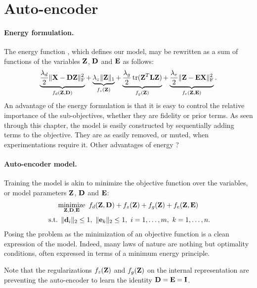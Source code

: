\section{Auto-encoder}

\paragraph{Energy formulation.}
The energy function , which defines our model, may be rewritten as a sum of functions of the variables $\mathbf{Z}$, $\mathbf{D}$ and $\mathbf{E}$ as follows:
\begin{equation} \label{eqn:objective}
	\underbrace{\frac{\lambda_d}{2} \| \mathbf{X} - \mathbf{D} \mathbf{Z} \|_\text{F}^2}_{f_d(\mathbf{Z}, \mathbf{D})} +
	\underbrace{\lambda_z \| \mathbf{Z} \|_1}_{f_z(\mathbf{Z})} +
	\underbrace{\frac{\lambda_g}{2} \operatorname*{tr}(\mathbf{Z}^T \mathbf{L} \mathbf{Z})}_{f_g(\mathbf{Z})} +
	\underbrace{\frac{\lambda_e}{2} \| \mathbf{Z} - \mathbf{E} \mathbf{X} \|_\text{F}^2}_{f_e(\mathbf{Z}, \mathbf{E})}.
\end{equation}
An advantage of the energy formulation is that it is easy to control the relative importance of the sub-objectives, whether they are fidelity or prior terms. As seen through this chapter, the model is easily constructed by sequentially adding terms to the objective. They are as easily removed, or muted, when experimentations require it.
{\color{red} Other advantages of energy ?}

\paragraph{Auto-encoder model.}
Training the model is akin to minimize the objective function  over the variables, or model parameters $\mathbf{Z}$, $\mathbf{D}$ and $\mathbf{E}$:
\begin{multline} \label{eqn:model}
	\operatorname*{minimize}\limits_{\mathbf{Z},\mathbf{D},\mathbf{E}} \  f_d(\mathbf{Z}, \mathbf{D}) + f_z(\mathbf{Z}) + f_g(\mathbf{Z}) + f_e(\mathbf{Z}, \mathbf{E}) \\
	\text{ s.t. } \|\mathbf{d}_i\|_2 \leq 1 ,\ \|\mathbf{e}_k\|_2 \leq 1 ,\ i = 1, \ldots, m ,\ k = 1, \ldots, n.
\end{multline}
Posing the problem as the minimization of an objective function is a clean expression of the model. Indeed, many laws of nature are nothing but optimality conditions, often expressed in terms of a minimum energy principle.

Note that the regularizations $f_z(\mathbf{Z})$ and $f_g(\mathbf{Z})$ on the internal representation are preventing the auto-encoder to learn the identity $\mathbf{D} = \mathbf{E} = \mathbf{I}$.

